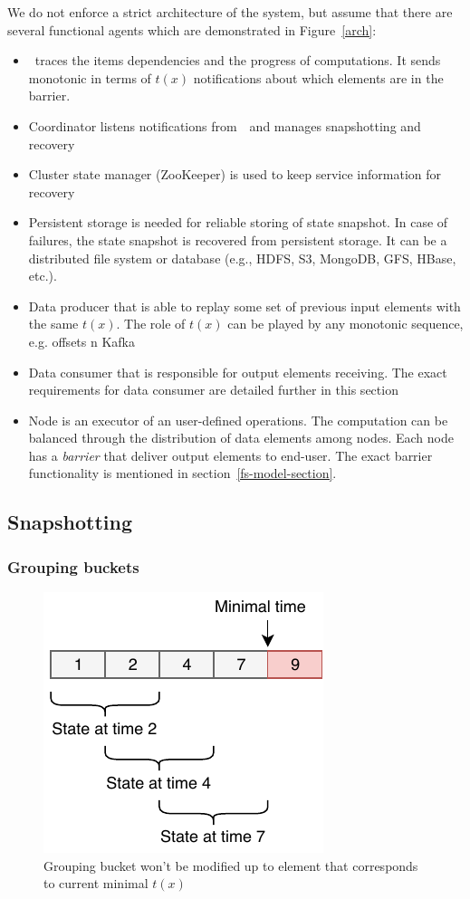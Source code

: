 We do not enforce a strict architecture of the system, but assume that there are several functional agents which are demonstrated in Figure~\ref{arch}:
\begin{itemize}
    \item \Acker\ traces the items dependencies and the progress of computations. It sends monotonic in terms of $t(x)$ notifications about which elements are in the barrier.
    \item Coordinator listens notifications from~\Acker\ and manages snapshotting and recovery
    \item Cluster state manager (ZooKeeper) is used to keep service information for recovery
    \item Persistent storage is needed for reliable storing of state snapshot. In case of failures, the state snapshot is recovered from persistent storage. It can be a distributed file system or database (e.g., HDFS, S3, MongoDB, GFS, HBase, etc.).
    \item Data producer that is able to replay some set of previous input elements with the same $t(x)$. The role of $t(x)$ can be played by any monotonic sequence, e.g. offsets n Kafka
    \item Data consumer that is responsible for output elements receiving. The exact requirements for data consumer are detailed further in this section
    \item Node is an executor of an user-defined operations. The computation can be balanced through the distribution of data elements among nodes. Each node has a {\em barrier} that deliver output elements to end-user. The exact barrier functionality is mentioned in section~\ref{fs-model-section}.
\end{itemize}

\subsection{Snapshotting}

\subsubsection{Grouping buckets}

\begin{figure}[htbp]
  \centering
  \includegraphics[width=0.5\columnwidth]{pics/substate}
  \caption{Grouping bucket won't be modified up to element that corresponds to current minimal $t(x)$}	
  \label {immutable}	
\end{figure}

